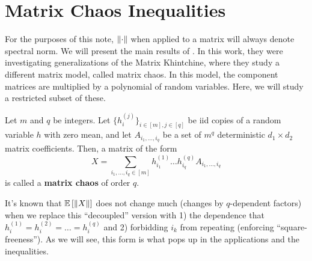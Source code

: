 
\def\title{Lecture Notes}
\def\coursenumber{}
\def\class{Matrix Concentration and Applications}
\def\semester{}
\def\name{Rohit Agarwal}
\def\title{Notes}
\lhead{}
\chead{\title}
\rhead{\name}
\lfoot{}
\rfoot{\thepage}




\newpage
\section{Matrix Chaos Inequalities}
For the purposes of this note, $\norm{\cdot}$ when applied to a matrix will always denote spectral norm.
We will present the main results of \cite{bandeira2025matrixchaosinequalitieschaos}.
In this work, they were investigating generalizations of the Matrix Khintchine, where they study a different
matrix model, called matrix chaos. In this model, the component
matrices are multiplied by a polynomial of random variables. Here, we will study
a restricted subset of these.
\begin{definition}
    Let $m$ and $q$ be integers.
    Let $\{h_{i}^{(j)}\}_{i \in [m], j \in [q]}$ be iid copies of a random variable $h$ with zero mean,
    and let $A_{i_1, \dots, i_q}$ be a set of $m^q$ deterministic $d_1 \times d_2$ matrix coefficients.
    Then, a matrix of the form
    \[ X = \sum_{i_1, \dots, i_q \in [m]} h_{i_1}^{(1)} \dots h_{i_q}^{(q)} A_{i_1, \dots, i_q}  \]
    is called a \textbf{matrix chaos} of order $q$.
\end{definition}
It's known that $\mathbb{E}\left[ \norm{X} \right]$ does not change much (changes by $q$-dependent factors) when we replace this ``decoupled'' version with
1) the dependence that $h_{i}^{(1)} = h_{i}^{(2)} = \dots = h_{i}^{(q)}$ and 2) forbidding $i_k$ from repeating (enforcing ``square-freeness'').
As we will see, this form is what pops up in the applications and the inequalities. 

